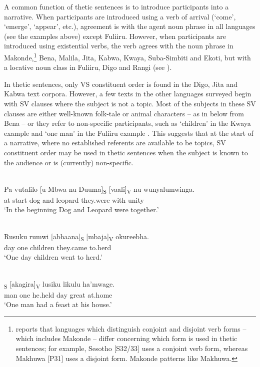 \documentclass[output=paper]{langsci/langscibook}
\begin{document}
A common function of thetic sentences is to introduce participants into a narrative. When participants are introduced using a verb of arrival (‘come’, ‘emerge’, ‘appear’, etc.), agreement is with the agent noun phrase in all languages (see the examples above) except Fuliiru. However, when participants are introduced using existential verbs, the verb agrees with the noun phrase in Makonde,\footnote{\citet{vanderwal2008} reports that languages which distinguish conjoint and disjoint verb forms -- which includes Makonde -- differ concerning which form is used in thetic sentences; for example, Sesotho [S32/33] uses a conjoint verb form, whereas Makhuwa [P31] uses a disjoint form. Makonde patterns like Makhuwa.} Bena, Malila, Jita, Kabwa, Kwaya, Suba-Simbiti and Ekoti, but with a locative noun class in Fuliiru, Digo and Rangi (see \citealt[17--20]{nicolle2015b}).

In thetic sentences, only VS constituent order is found in the Digo, Jita and Kabwa text corpora. However, a few texts in the other languages surveyed begin with SV clauses where the subject is not a topic. Most of the subjects in these SV clauses are either well-known folk-tale or animal characters -- as in  below from Bena -- or they refer to non-specific participants, such as ‘children’ in the Kwaya example  and ‘one man’ in the Fuliiru example . This suggests that at the start of a narrative, where no established referents are available to be topics, SV constituent order may be used in thetic sentences when the subject is known to the audience or is (currently) non-specific.

\ea\label{ex:26.nicolle}
\\
\gll Pa vutalilo [u-Mbwa nu Duuma]\textsubscript{S} [vaali]\textsubscript{V} nu wunyalumwinga.\\
at start {\db}dog and leopard {\db}they.were with unity\\
\glt ‘In the beginning Dog and Leopard were together.’
\z

\ea\label{ex:27.nicolle}
\\
\gll Rusuku rumwi [abhaana]\textsubscript{S} [mbaja]\textsubscript{V} okureebha.\\
day one {\db}children {\db}they.came to.herd\\
\glt ‘One day children went to herd.’
\z

\ea\label{ex:28.nicolle}
\\
\textsubscript{S} [akagira]\textsubscript{V} lusiku likulu ha’mwage.\\
{\db}man one {\db}he.held day great at.home\\
\glt ‘One man had a feast at his house.’
\z
\end{document}
